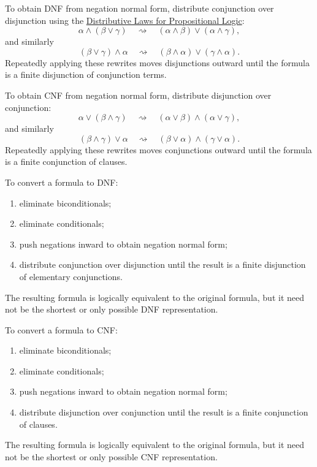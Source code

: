 \begin{remark*}
To obtain DNF from negation normal form, distribute conjunction over
disjunction using the
\hyperref[thm:distributive-laws-propositional-logic]{Distributive Laws for Propositional Logic}:
\[
\alpha\land(\beta\lor\gamma)
\quad\rightsquigarrow\quad
(\alpha\land\beta)\lor(\alpha\land\gamma),
\]
and similarly
\[
(\beta\lor\gamma)\land\alpha
\quad\rightsquigarrow\quad
(\beta\land\alpha)\lor(\gamma\land\alpha).
\]
Repeatedly applying these rewrites moves disjunctions outward until the formula
is a finite disjunction of conjunction terms.
\end{remark*}

\begin{remark*}
To obtain CNF from negation normal form, distribute disjunction over
conjunction:
\[
\alpha\lor(\beta\land\gamma)
\quad\rightsquigarrow\quad
(\alpha\lor\beta)\land(\alpha\lor\gamma),
\]
and similarly
\[
(\beta\land\gamma)\lor\alpha
\quad\rightsquigarrow\quad
(\beta\lor\alpha)\land(\gamma\lor\alpha).
\]
Repeatedly applying these rewrites moves conjunctions outward until the formula
is a finite conjunction of clauses.
\end{remark*}

\begin{remark*}
To convert a formula to DNF:
\begin{enumerate}
  \item eliminate biconditionals;
  \item eliminate conditionals;
  \item push negations inward to obtain negation normal form;
  \item distribute conjunction over disjunction until the result is a finite
        disjunction of elementary conjunctions.
\end{enumerate}
The resulting formula is logically equivalent to the original formula, but it
need not be the shortest or only possible DNF representation.
\end{remark*}

\begin{remark*}
To convert a formula to CNF:
\begin{enumerate}
  \item eliminate biconditionals;
  \item eliminate conditionals;
  \item push negations inward to obtain negation normal form;
  \item distribute disjunction over conjunction until the result is a finite
        conjunction of clauses.
\end{enumerate}
The resulting formula is logically equivalent to the original formula, but it
need not be the shortest or only possible CNF representation.
\end{remark*}


